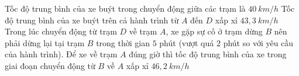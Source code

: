 \begin{ex}
{
}
{\True Tốc độ trung bình của xe buýt trong chuyển động giữa các trạm là $40 \ km/h$}
{Tốc độ trung bình của xe buýt trên cả hành trình từ $A$ đến $D$ xấp xỉ $43,3 \ km / h$}
{\True Trong lúc chuyển động từ trạm $D$ về trạm $A$, xe gặp sự cố ở trạm dừng $B$ nên phải dừng lại tại trạm $B$ trong thời gian $5$ phút (vượt quá $2$ phút so với yêu cầu của hành trình). Để xe về trạm $A$ đúng giờ thì tốc độ trung bình của xe trong giai đoạn chuyển động từ $B$ về $A$ xấp xỉ $46,2 \ km / h$}
\loigiai{
\begin{itemchoice}
\itemch 
\itemch 
\itemch 
\itemch 
\end{itemchoice}
}
\end{ex}
